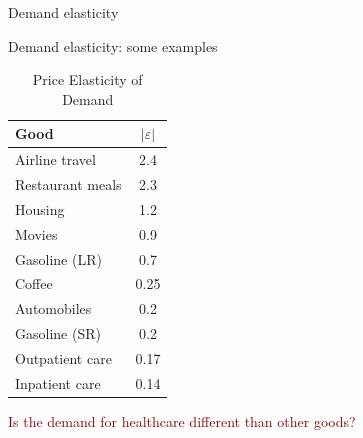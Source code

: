 \begin{frame}{Demand elasticity}
\begin{center}
    \end{center}
      
\end{frame}
\begin{frame}{Demand elasticity: some examples}

    \begin{center}
        \footnotesize
        \begin{table}[htbp]
            \centering
            \caption{Price Elasticity of Demand}
            \label{tab:price_elasticity}
            \begin{tabular}{l c}
            \hline
            \textbf{Good} & $\lvert \varepsilon \rvert$ \\
            \hline
            Airline travel   & 2.4  \\
            Restaurant meals & 2.3  \\
            Housing          & 1.2  \\
            Movies           & 0.9  \\
            Gasoline (LR)    & 0.7  \\
            Coffee           & 0.25 \\
            Automobiles      & 0.2  \\
            Gasoline (SR)    & 0.2  \\
            Outpatient care  & 0.17 \\
            Inpatient care   & 0.14 \\
            \hline
            \end{tabular}
            \end{table}              
        \end{center}
          
    \end{frame}
\begin{frame}{}

    \begin{center}
        \Large \textcolor{maroon}{Is the demand for healthcare different than other goods?}
        \end{center}
\end{frame}
